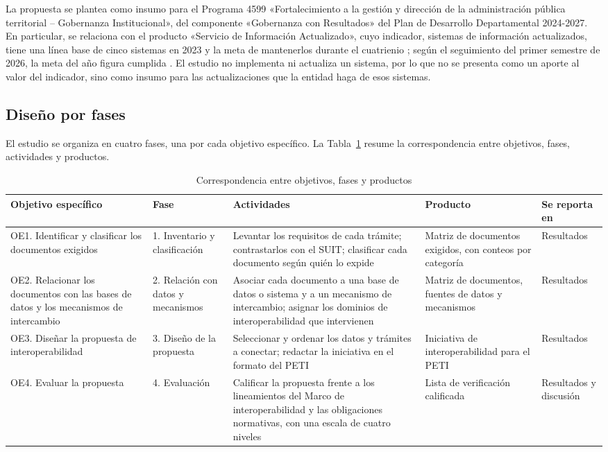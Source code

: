 La propuesta se plantea como insumo para el Programa 4599 «Fortalecimiento a la gestión y dirección de la administración pública territorial – Gobernanza Institucional», del componente «Gobernanza con Resultados» del Plan de Desarrollo Departamental 2024-2027. En particular, se relaciona con el producto «Servicio de Información Actualizado», cuyo indicador, sistemas de información actualizados, tiene una línea base de cinco sistemas en 2023 y la meta de mantenerlos durante el cuatrienio \parencite[p.~188]{gobernaciondelhuila2024ordenanza}; según el seguimiento del primer semestre de 2026, la meta del año figura cumplida \parencite[p.~23]{gobernaciondelhuila2026seguimiento}. El estudio no implementa ni actualiza un sistema, por lo que no se presenta como un aporte al valor del indicador, sino como insumo para las actualizaciones que la entidad haga de esos sistemas.

\subsection{Diseño por fases}

El estudio se organiza en cuatro fases, una por cada objetivo específico. La Tabla~\ref{tab:fases} resume la correspondencia entre objetivos, fases, actividades y productos.

\begin{table}[htbp]
\centering
\caption{Correspondencia entre objetivos, fases y productos}
\label{tab:fases}
\small
\begin{tabular}{p{2.6cm}p{2.4cm}p{4.2cm}p{3.2cm}p{1.8cm}}
\hline
Objetivo específico & Fase & Actividades & Producto & Se reporta en \\
\hline
OE1. Identificar y clasificar los documentos exigidos & 1. Inventario y clasificación & Levantar los requisitos de cada trámite; contrastarlos con el SUIT; clasificar cada documento según quién lo expide & Matriz de documentos exigidos, con conteos por categoría & Resultados \\
OE2. Relacionar los documentos con las bases de datos y los mecanismos de intercambio & 2. Relación con datos y mecanismos & Asociar cada documento a una base de datos o sistema y a un mecanismo de intercambio; asignar los dominios de interoperabilidad que intervienen & Matriz de documentos, fuentes de datos y mecanismos & Resultados \\
OE3. Diseñar la propuesta de interoperabilidad & 3. Diseño de la propuesta & Seleccionar y ordenar los datos y trámites a conectar; redactar la iniciativa en el formato del PETI & Iniciativa de interoperabilidad para el PETI & Resultados \\
OE4. Evaluar la propuesta & 4. Evaluación & Calificar la propuesta frente a los lineamientos del Marco de interoperabilidad y las obligaciones normativas, con una escala de cuatro niveles & Lista de verificación calificada & Resultados y discusión \\
\hline
\end{tabular}
\end{table}

